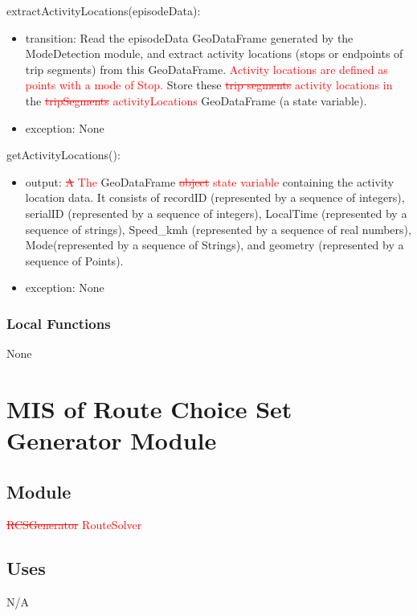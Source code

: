 \documentclass[12pt, titlepage]{article}
\begin{document}
\noindent extractActivityLocations(episodeData):
\begin{itemize}
\item transition: Read the episodeData GeoDataFrame generated by the ModeDetection module, and extract activity locations (stops or endpoints of trip segments) from this GeoDataFrame. \textcolor{red}{Activity locations are defined as points with a mode of Stop.} Store these \textcolor{red}{\sout{trip segments}} \textcolor{red}{activity locations in} the \textcolor{red}{\sout{tripSegments}} \textcolor{red}{activityLocations} GeoDataFrame (a state variable).
\item exception: None
\end{itemize}

\noindent getActivityLocations():
\begin{itemize}
\item output: \textcolor{red}{\sout{A} The} GeoDataFrame \textcolor{red}{\sout{object} state variable} containing the activity location data.  It consists of recordID (represented by a sequence of integers), serialID (represented by a sequence of integers), LocalTime (represented by a sequence of strings), Speed\_kmh (represented by a sequence of real numbers), Mode(represented by a sequence of Strings), and geometry (represented by a sequence of Points).
\item exception: None
\end{itemize}

\subsubsection{Local Functions}

None

\newpage

\section{MIS of Route Choice Set Generator Module} \label{RCSGenerator}

\subsection{Module}
\textcolor{red}{\sout{RCSGenerator} RouteSolver}

\subsection{Uses}
N/A
\end{document}
